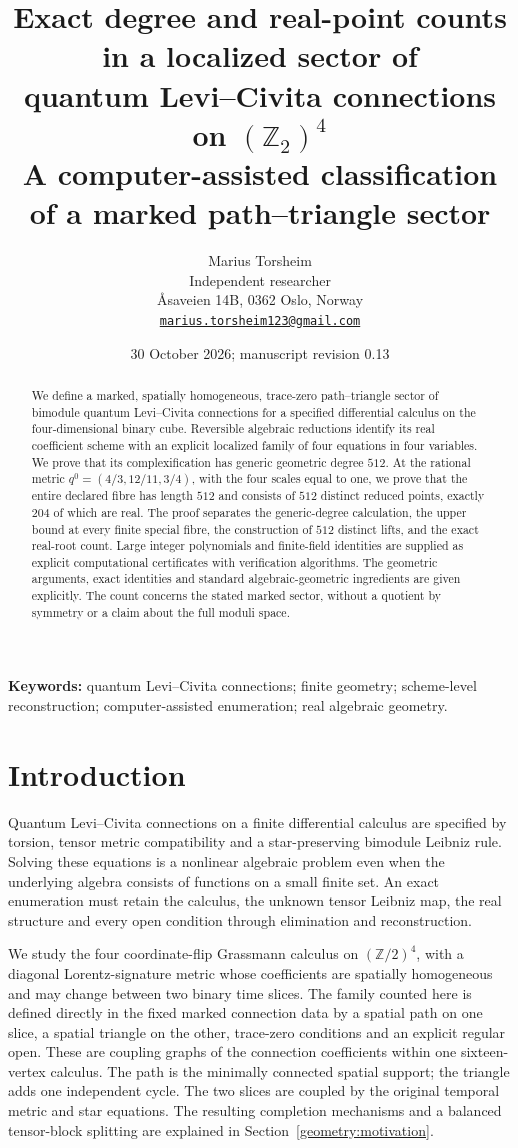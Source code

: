 \documentclass[11pt,a4paper]{article}
\title{\textbf{Exact degree and real-point counts in a localized sector of}\\
\textbf{quantum Levi--Civita connections on $(\mathbb Z_2)^4$}\\[0.4em]
\large A computer-assisted classification of a marked path--triangle sector}
\author{Marius Torsheim\\[0.3em]
\small Independent researcher\\
\small \AA{}saveien 14B, 0362 Oslo, Norway\\
\small\href{mailto:marius.torsheim123@gmail.com}{\texttt{marius.torsheim123@gmail.com}}}
\date{30 October 2026; manuscript revision 0.13}
\theoremstyle{remark}\newtheorem{remark}[theorem]{Remark}
\begin{document}
\maketitle
\begin{abstract}
We define a marked, spatially homogeneous, trace-zero path--triangle
sector of bimodule quantum Levi--Civita connections for a specified
differential calculus on the four-dimensional binary cube. Reversible
algebraic reductions identify its real coefficient scheme with an explicit
localized family of four equations in four variables. We prove that its complexification
has generic geometric degree $512$. At the rational metric
$q^0=(4/3,12/11,3/4)$, with the four scales equal to one, we prove that
the entire declared fibre has length $512$ and consists of $512$ distinct
reduced points, exactly $204$ of which are real.
The proof separates the generic-degree calculation, the upper bound at
every finite special fibre, the construction of $512$ distinct lifts,
and the exact real-root count. Large integer polynomials and finite-field
identities are supplied as explicit computational certificates with
verification algorithms. The geometric arguments, exact identities and
standard algebraic-geometric ingredients are given explicitly. The count concerns the stated marked sector,
without a quotient by symmetry or a claim about the full moduli space.
\end{abstract}
\noindent\textbf{Keywords:} quantum Levi--Civita connections; finite geometry;
scheme-level reconstruction; computer-assisted enumeration; real algebraic geometry.

\section{Introduction}
Quantum Levi--Civita connections on a finite differential calculus are
specified by torsion, tensor metric compatibility and a star-preserving
bimodule Leibniz rule. Solving these equations is a nonlinear algebraic
problem even when the underlying algebra consists of functions on a
small finite set. An exact enumeration must retain the calculus, the
unknown tensor Leibniz map, the real structure and every open condition
through elimination and reconstruction.

We study the four coordinate-flip Grassmann calculus on
$(\mathbb Z/2)^4$, with a diagonal Lorentz-signature metric whose
coefficients are spatially homogeneous and may change between two
binary time slices. The family counted here is defined directly in the fixed marked connection data
by a spatial path on one slice, a spatial triangle on the other,
trace-zero conditions and an explicit regular open. These are coupling
graphs of the connection coefficients within one sixteen-vertex
calculus. The path is the minimally connected spatial support; the
triangle adds one independent cycle. The two slices are coupled by the
original temporal metric and star equations. The resulting completion
mechanisms and a balanced tensor-block splitting are explained in
Section~\ref{geometry:motivation}.
\end{document}
